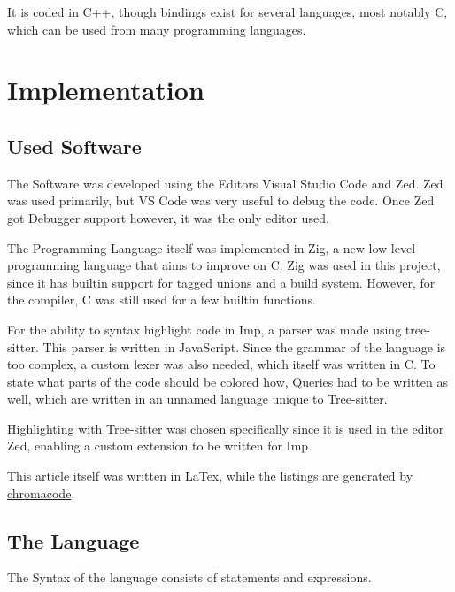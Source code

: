 \documentclass[12pt]{article}
\begin{document}
It is coded in C++, though bindings exist for several languages, most notably
C, which can be used from many programming languages.

\section{Implementation}

\subsection{Used Software}

The Software was developed using the Editors Visual Studio Code and Zed.
Zed was used primarily, but VS Code was very useful to debug the code.
Once Zed got Debugger support however, it was the only editor used.

The Programming Language itself was implemented in Zig, a new low-level programming
language that aims to improve on C. Zig was used in this project, since it has builtin
support for tagged unions and a build system. However, for the compiler, C was still used for
a few builtin functions.

For the ability to syntax highlight code in Imp, a parser was made using tree-sitter.
This parser is written in JavaScript. Since the grammar of the language is too complex,
a custom lexer was also needed, which itself was written in C.
To state what parts of the code should be colored how, Queries had to be written as well,
which are written in an unnamed language unique to Tree-sitter.

Highlighting with Tree-sitter was chosen specifically since it is used
in the editor Zed, enabling a custom extension to be written for Imp.

This article itself was written in LaTex, while the listings are generated
by \href{https://github.com/TomLebeda/chroma_code}{chromacode}.


\subsection{The Language}



The Syntax of the language consists of statements and expressions.
\end{document}
